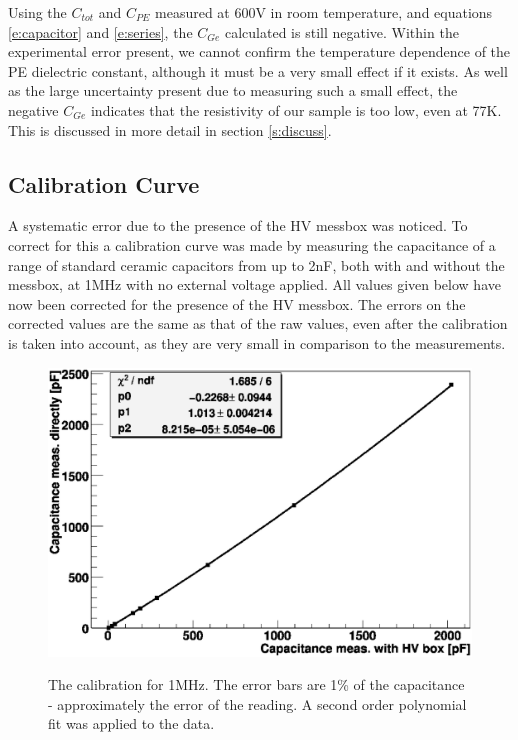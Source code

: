 \documentclass[a4paper,11pt]{article}
\begin{document}
Using the $C_{tot}$ and $C_{PE}$ measured at 600V in room temperature, and equations \ref{e:capacitor} and \ref{e:series}, the $C_{Ge}$ calculated is still negative. Within the experimental error present, we cannot confirm the temperature dependence of the PE dielectric constant, although it must be a very small effect if it exists. As well as the large uncertainty present due to measuring such a small effect, the negative $C_{Ge}$ indicates that the resistivity of our sample is too low, even at 77K. This is discussed in more detail in section \ref{s:discuss}.

\subsection{Calibration Curve}
\label{ss:calib}

A systematic error due to the presence of the HV messbox was noticed. To correct for this a calibration curve was made by measuring the capacitance of a range of standard ceramic capacitors from up to 2nF, both with and without the messbox, at 1MHz with no external voltage applied. All values given below have now been corrected for the presence of the HV messbox. The errors on the corrected values are the same as that of the raw values, even after the calibration is taken into account, as they are very small in comparison to the measurements. 

\begin{figure}[htpb]
\centering
\includegraphics[scale=0.38]{calib}
	\label{f:calCurve}
	\caption{The calibration for 1MHz. The error bars are 1\% of the capacitance - approximately the error of the reading. A second order polynomial fit was applied to the data.}
\end{figure}
\end{document}

